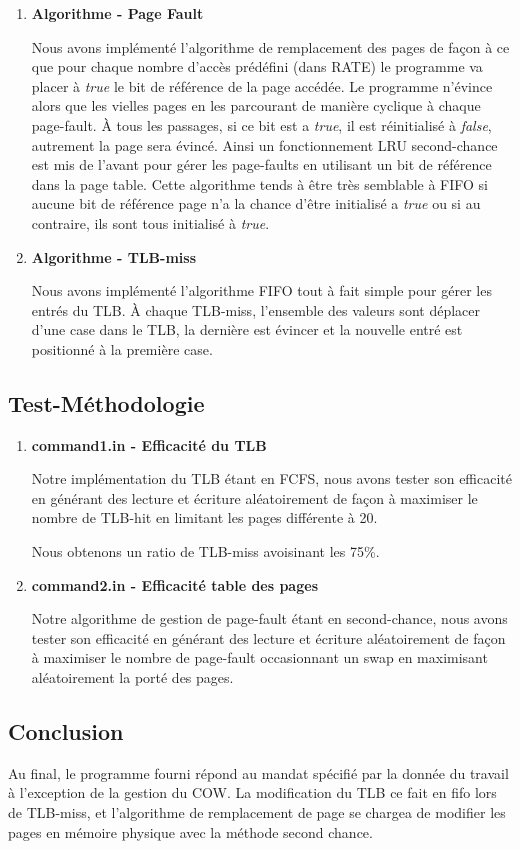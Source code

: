 \documentclass{article}
\begin{document}
\begin{enumerate}
	
	\item \textbf{Algorithme - Page Fault} 
	
  Nous avons implémenté l'algorithme de remplacement des pages de façon à ce que pour chaque nombre d'accès prédéfini (dans RATE) le programme va placer à 
  {\em true} le bit de référence de la page accédée. Le programme n'évince alors que les vielles pages en les parcourant de manière cyclique à chaque page-fault. À tous les passages, si ce bit est a {\em true}, il est réinitialisé à {\em false}, autrement la page sera évincé. Ainsi un fonctionnement LRU second-chance est mis de l'avant pour gérer les page-faults en utilisant un bit de référence dans la page table. Cette algorithme tends à être très semblable à FIFO si aucune bit de référence page n'a la chance d'être initialisé a {\em true} ou si au contraire, ils sont tous initialisé à {\em true}.
  
  \item \textbf{Algorithme - TLB-miss} 
  
  Nous avons implémenté l'algorithme FIFO tout à fait simple pour gérer les entrés du TLB. À chaque TLB-miss,
  l'ensemble des valeurs sont déplacer d'une case dans le TLB, la dernière est évincer et la nouvelle entré est positionné à la première case.
	
	
\end{enumerate}


\subsection*{Test-Méthodologie}

\begin{enumerate}
	\item \textbf{command1.in - Efficacité du TLB} 
	
	Notre implémentation du TLB étant en FCFS, nous avons tester son efficacité en générant des lecture et écriture aléatoirement de façon à maximiser le nombre de TLB-hit en limitant les pages différente à 20.
	
	Nous obtenons un ratio de TLB-miss avoisinant les 75\%.
	
	\item \textbf{command2.in - Efficacité table des pages} 
	
	Notre algorithme de gestion de page-fault étant en second-chance, nous avons tester son efficacité en générant des lecture et écriture aléatoirement de façon à maximiser le nombre de page-fault occasionnant un swap en maximisant aléatoirement la porté des pages.
	
	
\end{enumerate}

\subsection*{Conclusion}
Au final, le programme fourni répond au mandat spécifié par la donnée du travail à l'exception de la gestion du COW. La modification du TLB ce fait en fifo lors de TLB-miss, et l'algorithme de remplacement de page se chargea de modifier les pages en mémoire physique avec la méthode second chance. 
\end{document}
